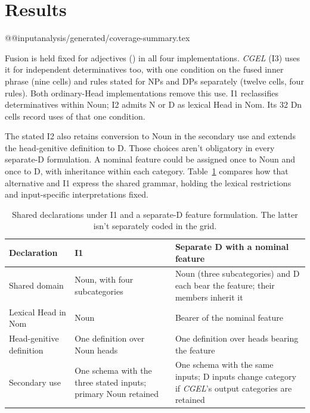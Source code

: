 \documentclass[12pt]{article}
\makeatletter
\newcommand{\tablebody}[1]{\csname @@input\endcsname #1 }
\makeatother
\begin{document}
\section{Results}

\tablebody{analysis/generated/coverage-summary.tex}

Fusion is held fixed for adjectives () in all four implementations. \textit{CGEL} (I3) uses it for independent determinatives too, with one condition on the fused inner phrase (nine cells) and rules stated for NPs and DPs separately (twelve cells, four rules). Both ordinary-Head implementations remove this use. I1 reclassifies determinatives within Noun; I2 admits N or D as lexical Head in Nom. Its 32 Dn cells record uses of that one condition.

The stated I2 also retains conversion to Noun in the secondary use and extends the head-genitive definition to D. Those choices aren't obligatory in every separate-D formulation. A nominal feature could be assigned once to Noun and once to D, with inheritance within each category. Table~\ref{tab:feature-alternative} compares how that alternative and I1 express the shared grammar, holding the lexical restrictions and input-specific interpretations fixed.

\begin{table}[H]\centering\small
\caption{Shared declarations under I1 and a separate-D feature formulation. The latter isn't separately coded in the grid.}\label{tab:feature-alternative}
\begin{tabular}{>{\raggedright\arraybackslash}p{3.2cm}>{\raggedright\arraybackslash}p{4.4cm}>{\raggedright\arraybackslash}p{4.4cm}}
\toprule
Declaration & I1 & Separate D with a nominal feature \\
\midrule
Shared domain & Noun, with four subcategories & Noun (three subcategories) and D each bear the feature; their members inherit it \\
Lexical Head in Nom & Noun & Bearer of the nominal feature \\
Head-genitive definition & One definition over Noun heads & One definition over heads bearing the feature \\
Secondary use & One schema with the three stated inputs; primary Noun retained & One schema with the same inputs; D inputs change category if \textit{CGEL}'s output categories are retained \\
\bottomrule
\end{tabular}
\end{table}
\end{document}
